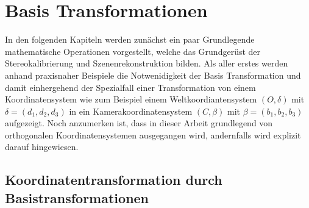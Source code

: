 \chapter{Basis Transformationen }
\label{sec:basisTransformation} 





 
In den folgenden Kapiteln werden zunächst ein paar Grundlegende mathematische Operationen vorgestellt, welche das Grundgerüst der Stereokalibrierung und Szenenrekonstruktion bilden.
Als aller erstes werden anhand praxisnaher Beispiele die Notwenidigkeit der Basis Transformation und damit einhergehend der Spezialfall einer Transformation von einem Koordinatensystem wie zum Beispiel einem Weltkoordiantensystem $(O,\delta)$ mit $\delta=(d_1, d_2, d_3)$ in ein Kamerakoordinatensystem $(C,\beta)$ mit $\beta=(b_1,b_2,b_3)$ aufgezeigt. Noch anzumerken ist, dass in dieser Arbeit grundlegend von orthogonalen Koordinatensystemen ausgegangen wird, andernfalls wird explizit darauf hingewiesen. 



%
%

\section{Koordinatentransformation durch Basistransformationen}

